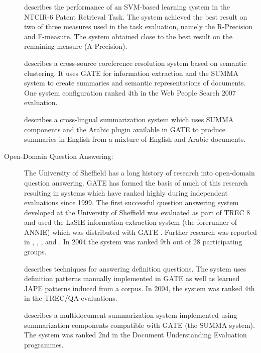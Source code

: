 \begin{description}

\item[\cite{Yaoyong07b}] describes the performance of an SVM-based learning
system in the NTCIR-6 Patent Retrieval Task. The system achieved the best result
on two of three measures used in the task evaluation, namely the R-Precision and
F-measure. The system obtained close to the best result on the remaining measure
(A-Precision).

\item[\cite{Saggion'07a}] describes a cross-source coreference resolution system
based on semantic clustering. It uses GATE for information extraction and the 
SUMMA system to create summaries and semantic representations of documents. One
system configuration ranked 4th in the Web People Search 2007 evaluation.

\item[\cite{Saggion'06a}] describes a cross-lingual summarization system which
uses SUMMA components and the Arabic plugin available in GATE to produce
summaries in English from a mixture of English and Arabic documents.

\item[Open-Domain Question Answering:] The University of Sheffield has a long
history of research into open-domain question answering. GATE has formed the
basis of much of this research resulting in systems which have ranked highly
during independent evaluations since 1999. The first successful question
answering system developed at the University of Sheffield was evaluated as part
of TREC 8 and used the LaSIE information extraction system (the forerunner of
ANNIE) which was distributed with GATE \cite{Humphreys99}. Further research was
reported in
\cite{Scott00}, \cite{Greenwood02}, \cite{Gaizauskas03a}, \cite{Gaizauskas04}
and \cite{Gaizauskas05}. In 2004 the system was ranked 9th out of 28
participating groups.

\item[\cite{Saggion'04a}] describes techniques for answering definition
questions. The system uses definition patterns manually implemented in GATE as
well as learned JAPE patterns induced from a corpus. In 2004, the system was
ranked 4th in the TREC/QA evaluations.

\item[\cite{Saggion&Gaizauskas'04b}] describes a multidocument summarization
system implemented using summarization components compatible with GATE (the
SUMMA system). The system was ranked 2nd in the Document Understanding Evaluation
programmes.


\end{description}
